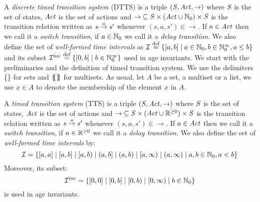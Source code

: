 A \emph{discrete timed transition system} (DTTS) 
is a triple $\left(\mathit{S}, \mathit{Act},\rightarrow\right)$
where $\mathit{S}$ is the set of states, $\mathit{Act}$ is the set of actions
and $\rightarrow\: \subseteq \mathit{S} \times (\mathit{Act} \cup \mathbb{N}_{0})  \times \mathit{S}$ is the 
transition relation written as $s \stackrel{a}{\rightarrow} s'$ whenever $(s,a,s') \in \rightarrow$.
If $a \in \mathit{Act}$ then we call it a \emph{switch transition}, if
$a \in \mathbb{N}_{0}$ we call it a \emph{delay transition}.
We also define the set of \emph{well-formed time intervals} as 
$\mathcal{I} \stackrel{\textrm{def}}{=} \{[a,b] \mid a \in \mathbb{N}_{0},b\in \mathbb{N}_{0}^{\infty}, a\leq b \}$
and its subset $\mathcal{I}^{\text{inv}} \stackrel{\textrm{def}}{=} \{[0,b] \mid b\in \mathbb{N}_{0}^{\infty} \}$
used in age invariants. 
We start with the preliminaries and the definition of timed transition system. 
We use the delimiters \{\} for sets and $\mathit{\{\!\!\{\}\!\!\}}$ for multisets.
As usual, let $A$ be a set, a multiset or a list, 
we use $x \in A$ to denote the membership of the element  $x$ in $A$. 

A \emph{timed transition system} (TTS) 
is a triple $\left(\mathit{S}, \mathit{Act},\rightarrow\right)$
where $\mathit{S}$ is the set of states, $\mathit{Act}$ is the set of actions
and $\rightarrow\: \subseteq \mathit{S} \times (\mathit{Act} \cup \mathbb{R}^{\geq 0})  \times \mathit{S}$ is the 
transition relation written as $s \stackrel{a}{\rightarrow} s'$ whenever $(s,a,s') \in \rightarrow$.
If $a \in \mathit{Act}$ then we call it a \emph{switch transition}, if
$a \in \mathbb{R}^{\geq 0}$ we call it a \emph{delay transition}.
We also define the set of \emph{well-formed time intervals} 
by: $$\mathcal{I} =\{ [a,a] \;|\; [a,b] \;|\; [a,b) \;|\; (a,b] \;|\; (a,b) \;|\; [a,\infty) \;|\; (a,\infty) \mid a,b \in \mathbb{N}_{0},a < b\}$$
 Moreover, its subset: $$\mathcal{I}^{\text{inv}} = \{ [0,0] \;|\; [0,b] \;|\; [0,b) \;|\; [0,\infty) \mid b \in \mathbb{N}_{0}\}$$
is used in age invariants. 

